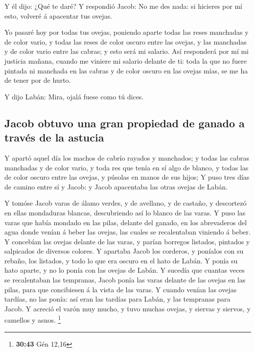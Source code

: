  Y él dijo: ¿Qué te daré? Y respondió Jacob: No me des
nada: si hicieres por mí esto, volveré á apacentar tus ovejas.

 Yo pasaré hoy por todas tus ovejas, poniendo aparte todas
las reses manchadas y de color vario, y todas las reses de color oscuro
entre las ovejas, y las manchadas y de color vario entre las cabras; y
esto será mi salario.  Así responderá por mí mi justicia
mañana, cuando me viniere mi salario delante de ti: toda la que no fuere
pintada ni manchada en las cabras y de color oscuro en las ovejas mías,
se me ha de tener por de hurto.

 Y dijo Labán: Mira, ojalá fuese como tú dices.

\hypertarget{jacob-obtuvo-una-gran-propiedad-de-ganado-a-travuxe9s-de-la-astucia}{%
\subsection{Jacob obtuvo una gran propiedad de ganado a través de la
astucia}\label{jacob-obtuvo-una-gran-propiedad-de-ganado-a-travuxe9s-de-la-astucia}}

 Y apartó aquel día los machos de cabrío rayados y
manchados; y todas las cabras manchadas y de color vario, y toda res que
tenía en sí algo de blanco, y todas las de color oscuro entre las
ovejas, y púsolas en manos de sus hijos;  Y puso tres días
de camino entre sí y Jacob: y Jacob apacentaba las otras ovejas de
Labán.

 Y tomóse Jacob varas de álamo verdes, y de avellano, y de
castaño, y descortezó en ellas mondaduras blancas, descubriendo así lo
blanco de las varas.  Y puso las varas que había mondado en
las pilas, delante del ganado, en los abrevaderos del agua donde venían
á beber las ovejas, las cuales se recalentaban viniendo á beber.
 Y concebían las ovejas delante de las varas, y parían
borregos listados, pintados y salpicados de diversos colores.
 Y apartaba Jacob los corderos, y poníalos con su rebaño,
los listados, y todo lo que era oscuro en el hato de Labán. Y ponía su
hato aparte, y no lo ponía con las ovejas de Labán.  Y
sucedía que cuantas veces se recalentaban las tempranas, Jacob ponía las
varas delante de las ovejas en las pilas, para que concibiesen á la
vista de las varas.  Y cuando venían las ovejas tardías, no
las ponía: así eran las tardías para Labán, y las tempranas para Jacob.
 Y acreció el varón muy mucho, y tuvo muchas ovejas, y
siervas y siervos, y camellos y asnos. \footnote{\textbf{30:43} Gén
  12,16}

